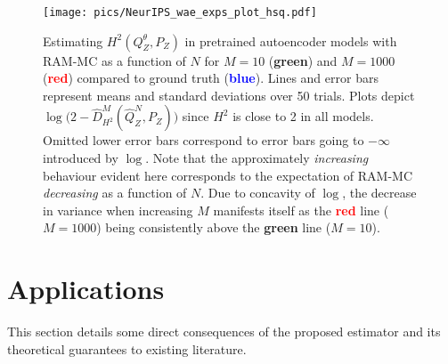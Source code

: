 \begin{figure}
\begin{center}
\texttt{[image: pics/NeurIPS\_wae\_exps\_plot\_hsq.pdf]}
\end{center}
\caption{\label{fig:real-exps-hsq}
Estimating $H^2(Q_Z^\theta , P_Z)$ in pretrained autoencoder models with RAM-MC as a function of $N$ for $M=10$ ({\bf \textcolor{green!65!blue}{green}}) and $M{=}1000$ ({\bf \textcolor{red}{red}}) compared to ground truth ({\bf\textcolor{blue}{blue}}).
Lines and error bars represent means and standard deviations over 50 trials.
Plots depict $\log\big(2 - \hat{D}^M_{H^2}(\hat{Q}^N_Z , P_Z)\big)$ since $H^2$ is close to 2 in all models.
Omitted lower error bars correspond to error bars going to $-\infty$ introduced by $\log$.
Note that the approximately \emph{increasing} behaviour evident here corresponds to the expectation of RAM-MC \emph{decreasing} as a function of $N$. 
Due to concavity of $\log$, the decrease in variance when increasing $M$ manifests itself as the {\bf \textcolor{red}{red}} line ($M{=}1000$) being consistently above the {\bf \textcolor{green!65!blue}{green}} line ($M{=}10$).
}
\end{figure}



\section{Applications}\label{sec:applications}
This section details some direct consequences of the proposed estimator and its theoretical guarantees to existing literature.

